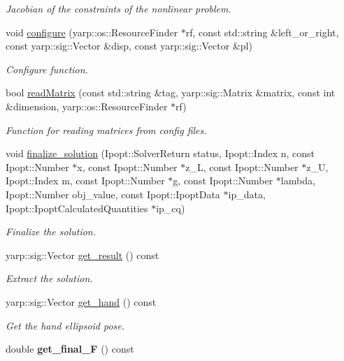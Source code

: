 \begin{DoxyCompactItemize}
\begin{DoxyCompactList}\small\item\em Jacobian of the constraints of the nonlinear problem. \end{DoxyCompactList}\item 
void \hyperlink{classgrasping__NLP_ab776f3ee1299d3927aa62b50f1bb3d3e}{configure} (yarp\+::os\+::\+Resource\+Finder $\ast$rf, const std\+::string \&left\+\_\+or\+\_\+right, const yarp\+::sig\+::\+Vector \&disp, const yarp\+::sig\+::\+Vector \&pl)
\begin{DoxyCompactList}\small\item\em Configure function. \end{DoxyCompactList}\item 
bool \hyperlink{classgrasping__NLP_a8104499f39d0f3705760a50745510c14}{read\+Matrix} (const std\+::string \&tag, yarp\+::sig\+::\+Matrix \&matrix, const int \&dimension, yarp\+::os\+::\+Resource\+Finder $\ast$rf)
\begin{DoxyCompactList}\small\item\em Function for reading matrices from config files. \end{DoxyCompactList}\item 
void \hyperlink{classgrasping__NLP_a99ab31792445766535d8117299b57da8}{finalize\+\_\+solution} (Ipopt\+::\+Solver\+Return status, Ipopt\+::\+Index n, const Ipopt\+::\+Number $\ast$x, const Ipopt\+::\+Number $\ast$z\+\_\+L, const Ipopt\+::\+Number $\ast$z\+\_\+U, Ipopt\+::\+Index m, const Ipopt\+::\+Number $\ast$g, const Ipopt\+::\+Number $\ast$lambda, Ipopt\+::\+Number obj\+\_\+value, const Ipopt\+::\+Ipopt\+Data $\ast$ip\+\_\+data, Ipopt\+::\+Ipopt\+Calculated\+Quantities $\ast$ip\+\_\+cq)
\begin{DoxyCompactList}\small\item\em Finalize the solution. \end{DoxyCompactList}\item 
yarp\+::sig\+::\+Vector \hyperlink{classgrasping__NLP_a15ce27b41ee64c471a66ea3f9db49381}{get\+\_\+result} () const 
\begin{DoxyCompactList}\small\item\em Extract the solution. \end{DoxyCompactList}\item 
yarp\+::sig\+::\+Vector \hyperlink{classgrasping__NLP_a1c012d56ae1dc44263eac74861b59008}{get\+\_\+hand} () const 
\begin{DoxyCompactList}\small\item\em Get the hand ellipsoid pose. \end{DoxyCompactList}\item 
double {\bfseries get\+\_\+final\+\_\+F} () const \label{classgrasping__NLP_ad6facc271a6368426df5ffa995abe8f5}

\end{DoxyCompactItemize}
